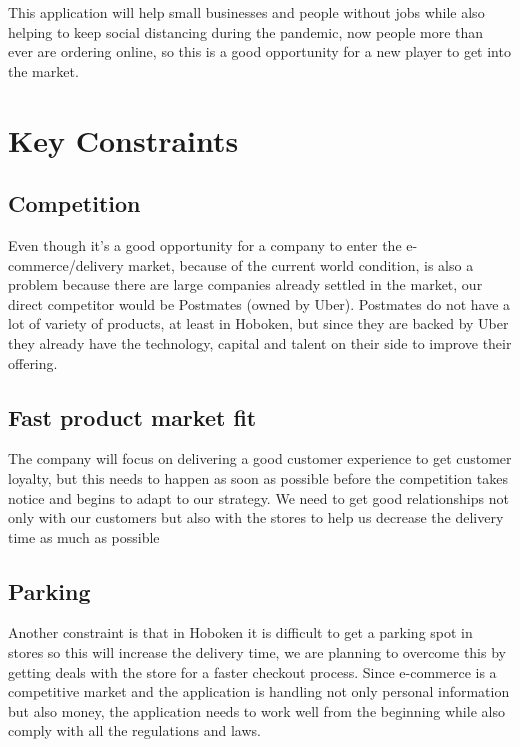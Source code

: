 \documentclass[12pt]{article}
\begin{document}
\noindent This application will help small businesses and people without jobs while also helping to keep social distancing during the pandemic, now people more than ever are ordering online, so this is a good opportunity for a new player to get into the market.

\pagebreak

\section{Key Constraints}
\subsection{Competition}
Even though it's a good opportunity for a company to enter the e-commerce/delivery market, because of the current world condition, is also a problem because there are large companies already settled in the market, our direct competitor would be Postmates (owned by Uber). Postmates do not have a lot of variety of products, at least in Hoboken, but since they are backed by Uber they already have the technology, capital and talent on their side to improve their offering. \newline

\subsection{Fast product market fit}
\noindent The company will focus on delivering a good customer experience to get customer loyalty, but this needs to happen as soon as possible before the competition takes notice and begins to adapt to our strategy. We need to get good relationships not only with our customers but also with the stores to help us decrease the delivery time as much as possible \newline

\subsection{Parking}
\noindent Another constraint is that in Hoboken it is difficult to get a parking spot in stores so this will increase the delivery time, we are planning to overcome this by getting deals with the store for a faster checkout process. Since e-commerce is a competitive market and the application is handling not only personal information but also money, the application needs to work well from the beginning while also comply with all the regulations and laws. \newline
\end{document}

